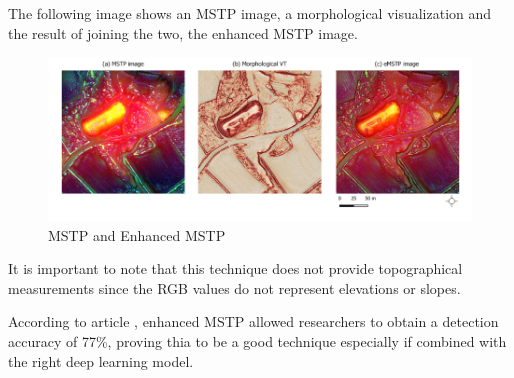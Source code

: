 The following image shows an MSTP image, a morphological visualization and the result of joining the two, the enhanced MSTP image.

\begin{figure}[H]
\centering
\includegraphics[width=12cm]{figs/mstp.png}
\caption{MSTP and Enhanced MSTP \cite{emstp}}
\end{figure}

It is important to note that this technique does not provide topographical measurements since the RGB values do not represent elevations or slopes.

According to article \cite{emstp}, enhanced MSTP allowed researchers to obtain a detection accuracy of 77\%, proving thia to be a good technique especially if combined with the right deep learning model.



